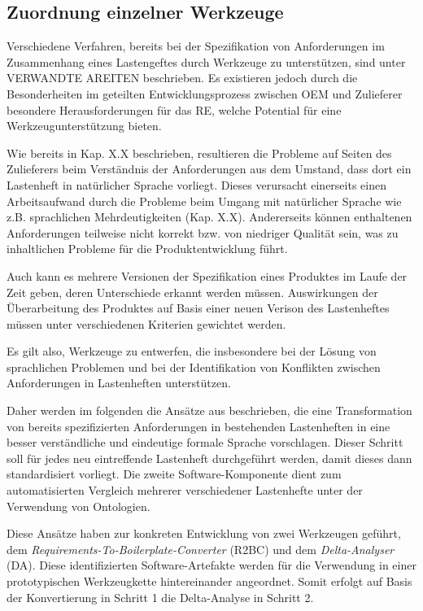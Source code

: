 \documentclass[12pt]{report}
\begin{document}
\subsection{Zuordnung einzelner Werkzeuge}
Verschiedene Verfahren, bereits bei der Spezifikation von Anforderungen im Zusammenhang eines Lastengeftes durch Werkzeuge zu unterstützen, sind unter VERWANDTE AREITEN beschrieben. Es existieren jedoch durch die Besonderheiten im geteilten Entwicklungsprozess zwischen OEM und Zulieferer besondere Herausforderungen für das RE, welche Potential für eine Werkzeugunterstützung bieten. 

Wie bereits in Kap. X.X beschrieben, resultieren die Probleme auf Seiten des Zulieferers beim Verständnis der Anforderungen aus dem Umstand, dass dort ein Lastenheft in natürlicher Sprache vorliegt. Dieses verursacht einerseits einen Arbeitsaufwand durch die Probleme beim Umgang mit natürlicher Sprache wie z.B. sprachlichen Mehrdeutigkeiten (Kap. X.X). Andererseits können enthaltenen Anforderungen teilweise nicht korrekt bzw. von niedriger Qualität sein, was zu inhaltlichen Probleme für die Produktentwicklung führt. 

Auch kann es mehrere Versionen der Spezifikation eines Produktes im Laufe der Zeit geben, deren Unterschiede erkannt werden müssen. Auswirkungen der Überarbeitung des Produktes auf Basis einer neuen Verison des Lastenheftes müssen unter verschiedenen Kriterien gewichtet werden. 

Es gilt also, Werkzeuge zu entwerfen, die insbesondere bei der Lösung von sprachlichen Problemen und bei der Identifikation von Konflikten zwischen Anforderungen in Lastenheften unterstützen. 

Daher werden im folgenden die Ansätze aus \cite{zh17} beschrieben, die eine Transformation von bereits spezifizierten Anforderungen in bestehenden Lastenheften in eine besser verständliche und eindeutige formale Sprache vorschlagen. Dieser Schritt soll für jedes neu eintreffende Lastenheft durchgeführt werden, damit dieses dann standardisiert vorliegt. Die zweite Software-Komponente dient zum automatisierten Vergleich mehrerer verschiedener Lastenhefte unter der Verwendung von Ontologien. 

Diese Ansätze haben zur konkreten Entwicklung von zwei Werkzeugen geführt, dem \textit{Requirements-To-Boilerplate-Converter} (R2BC) und dem \textit{Delta-Analyser} (DA). Diese identifizierten Software-Artefakte werden für die Verwendung in einer prototypischen Werkzeugkette hintereinander angeordnet. Somit erfolgt auf Basis der Konvertierung in Schritt 1 die Delta-Analyse in Schritt 2.
\end{document}
